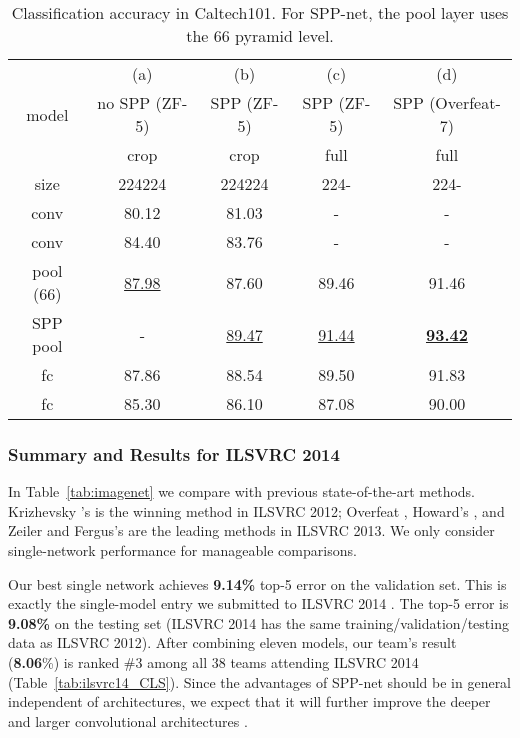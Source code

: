 \documentclass[10pt,journal,cspaper,compsoc]{IEEEtran}
\begin{document}
\setlength{\tabcolsep}{8pt}
\begin{table*}[t]
\footnotesize
\begin{center}
\begin{tabular}{c|c c c c}
\hline
      & (a)       & (b) & (c) & (d)\\
model & no SPP (ZF-5) & SPP (ZF-5) & SPP (ZF-5) & SPP (Overfeat-7)\\
\hline
     &                    crop     &    crop    &  full &  full\\
size &                224224 & 224224 & 224- & 224-\\
\hline
conv &              80.12 & 81.03 & -  & - \\
conv &              84.40 & 83.76 & - & - \\
pool (66) & \underline{87.98} & 87.60 & 89.46 & 91.46\\
SPP pool          &   -   & \underline{89.47} & \underline{91.44} &  \underline{\textbf{93.42}} \\
fc &                87.86 & 88.54 & 89.50 & 91.83 \\
fc &                85.30 & 86.10 & 87.08 & 90.00 \\
\hline
\end{tabular}
\caption{Classification accuracy in Caltech101. For SPP-net, the pool layer uses the 66 pyramid level.}
\label{tab:caltech101}
\end{center}
\end{table*}

\subsubsection{Summary and Results for ILSVRC 2014}

In Table~\ref{tab:imagenet} we compare with previous state-of-the-art methods. Krizhevsky \etal's \cite{Krizhevsky2012} is the winning method in ILSVRC 2012; Overfeat \cite{Sermanet2013}, Howard's \cite{Howard2013}, and Zeiler and Fergus's \cite{Zeiler2013} are the leading methods in ILSVRC 2013. We only consider single-network performance for manageable comparisons.

Our best single network achieves \textbf{9.14\%} top-5 error on the validation set. This is exactly the single-model entry we submitted to ILSVRC 2014 \cite{Russakovsky2014}. The top-5 error is \textbf{9.08\%} on the testing set (ILSVRC 2014 has the same training/validation/testing data as ILSVRC 2012). After combining eleven models, our team's result (\textbf{8.06}\%) is ranked \#3 among all 38 teams attending ILSVRC 2014 (Table~\ref{tab:ilsvrc14_CLS}).
Since the advantages of SPP-net should be in general independent of architectures, we expect that it will further improve the deeper and larger convolutional architectures \cite{Simonyan2014,Szegedy2014}.
\end{document}
